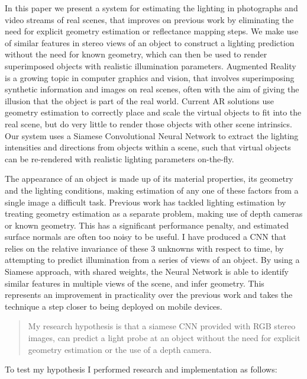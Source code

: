 \documentclass[ %
                    author={Gavin Parker},
                supervisor={Dr. Neill Campbell},
                    degree={MEng},
                     title={Deep Siamese Networks for Illumination Estimation from Stereo Images},
                  subtitle={},
                      type={research},
                      year={2018} ]{dissertation}
\begin{document}
\noindent
In this paper we present a system for estimating the lighting in photographs and video streams of real scenes, that improves on previous work by eliminating the need for explicit geometry estimation or reflectance mapping steps. We make use of similar features in stereo views of an object to construct a lighting prediction without the need for known geometry, which can then be used to render superimposed objects with realistic illumination parameters.
\newline
Augmented Reality is a growing topic in computer graphics and vision, that involves superimposing synthetic information and images on real scenes, often with the aim of giving the illusion that the object is part of the real world. Current AR solutions use geometry estimation to correctly place and scale the virtual objects to fit into the real scene, but do very little to render those objects with other scene intrinsics. Our system uses a Siamese Convolutional Neural Network to extract the lighting intensities and directions from objects within a scene, such that virtual objects can be re-rendered with realistic lighting parameters on-the-fly.

The appearance of an object is made up of its material properties, its geometry and the lighting conditions, making estimation of any one of these factors from a single image a difficult task. Previous work has tackled lighting estimation by treating geometry estimation as a separate problem, making use of depth cameras or known geometry. This has a significant performance penalty, and estimated surface normals are often too noisy to be useful. I have produced a CNN that relies on the relative invariance of these 3 unknowns with respect to time, by attempting to predict illumination from a series of views of an object. By using a Siamese approach, with shared weights, the Neural Network is able to identify similar features  in multiple views of the scene, and infer geometry. This represents an improvement in practicality over the previous work and takes the technique a step closer to being deployed on mobile devices.

\begin{quote}
My research hypothesis is that a siamese CNN provided with RGB stereo images, can predict a light probe at an object without the need for explicit geometry estimation or the use of a depth camera.
\end{quote}

To test my hypothesis I performed research and implementation as follows:
\end{document}
